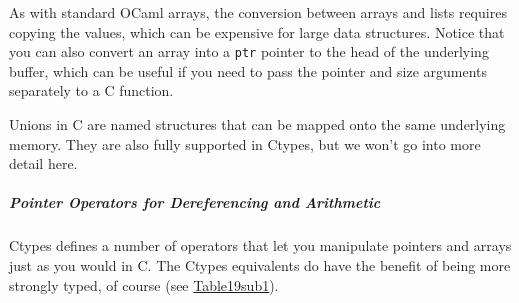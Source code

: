 As with standard OCaml arrays, the conversion between arrays and lists
requires copying the values, which can be expensive for large data
structures. Notice that you can also convert an array into a
\passthrough{\lstinline!ptr!} pointer to the head of the underlying
buffer, which can be useful if you need to pass the pointer and size
arguments separately to a C function.

Unions in C are named structures that can be mapped onto the same
underlying memory. They are also fully supported in Ctypes, but we won't
go into more detail here.

\hypertarget{pointer-operators-for-dereferencing-and-arithmetic}{%
\subparagraph{Pointer Operators for Dereferencing and
Arithmetic}\label{pointer-operators-for-dereferencing-and-arithmetic}}

Ctypes defines a number of operators that let you manipulate pointers
and arrays just as you would in C. The Ctypes equivalents do have the
benefit of being more strongly typed, of course (see
\href{foreign-function-interface.html\#Table19sub1}{Table19sub1}).

